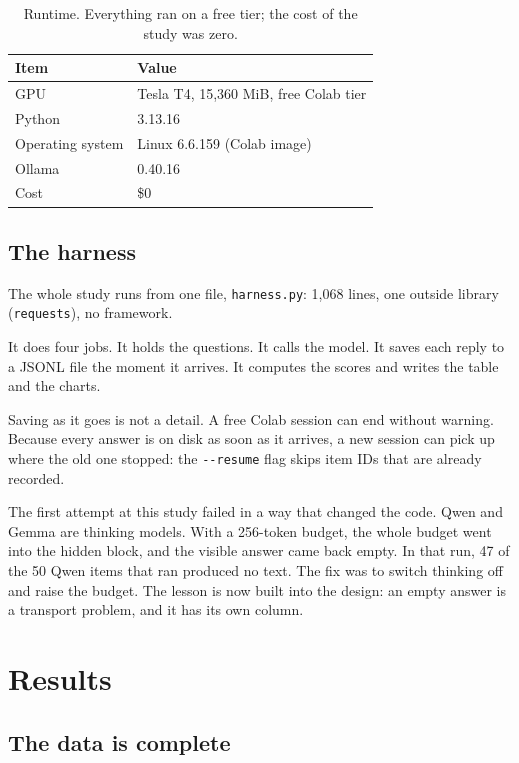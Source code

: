 \documentclass[11pt,a4paper]{article}
\begin{document}
\begin{table}[htbp]
\centering
\caption{Runtime. Everything ran on a free tier; the cost of the study was zero.}
\label{tab:hardware}
\begin{tabular}{@{}ll@{}}
\toprule
Item & Value \\
\midrule
GPU & Tesla T4, 15,360 MiB, free Colab tier \\
Python & 3.13.16 \\
Operating system & Linux 6.6.159 (Colab image) \\
Ollama & 0.40.16 \\
Cost & \$0 \\
\bottomrule
\end{tabular}
\end{table}

\subsection{The harness}
\label{sec:harness}

The whole study runs from one file, \texttt{harness.py}: 1,068 lines, one outside library (\texttt{requests}), no framework.

It does four jobs. It holds the questions. It calls the model. It saves each reply to a JSONL file the moment it arrives. It computes the scores and writes the table and the charts.

Saving as it goes is not a detail. A free Colab session can end without warning. Because every answer is on disk as soon as it arrives, a new session can pick up where the old one stopped: the \texttt{-{}-resume} flag skips item IDs that are already recorded.

The first attempt at this study failed in a way that changed the code. Qwen and Gemma are thinking models. With a 256-token budget, the whole budget went into the hidden block, and the visible answer came back empty. In that run, 47 of the 50 Qwen items that ran produced no text. The fix was to switch thinking off and raise the budget. The lesson is now built into the design: an empty answer is a transport problem, and it has its own column.

\section{Results}

\subsection{The data is complete}
\end{document}
